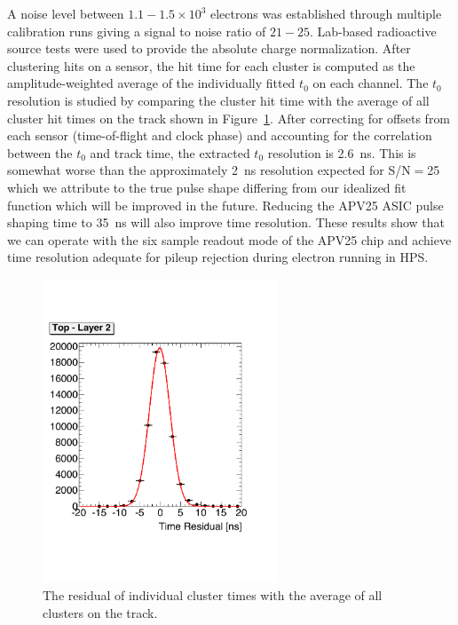 \documentclass[final,3p,times,twocolumn]{elsarticle}
\begin{document}
A noise level between $1.1-1.5\times 10^{3}$ electrons was established through multiple calibration 
runs giving a signal to noise ratio of $21-25$. Lab-based radioactive source tests were used to 
provide the absolute charge normalization.
After clustering hits on a sensor, the hit time for each cluster is computed 
as the amplitude-weighted average of the individually fitted $t_0$ on each channel. The 
$t_0$ resolution is studied by comparing the cluster hit time with the average of all cluster hit times on 
the track shown in Figure~\ref{fig:tracktime}. 
After correcting for offsets from each sensor (time-of-flight and clock phase) and accounting for the 
correlation between the $t_0$ and track time,  the extracted $t_0$ resolution is 2.6~ns. This is 
somewhat worse than the approximately 2~ns resolution expected for S/N$=$25 which we attribute to the 
true pulse shape differing from our idealized fit function which will be improved in the future. Reducing 
the APV25 ASIC pulse shaping time to 35~ns will also improve time resolution. 
These results show that we can operate with the six sample readout mode of the APV25 chip and 
achieve time resolution adequate for pileup rejection during electron running in HPS. 
\begin{figure}[]
\begin{center}
{\small
	\includegraphics[width=7cm]{figures/test_run_1351_hit_time_corrected_top_layer2_mod.pdf}
	\caption{
	The residual of individual cluster times with the average of all clusters on the track. }
	\label{fig:tracktime}
}
\end{center}
\end{figure}
\end{document}
